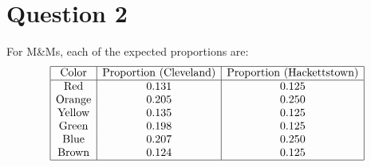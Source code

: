 \documentclass{article}
\begin{document}
\section*{Question 2}

\noindent For M\&Ms, each of the expected proportions are:
\[
\begin{array}{|c|c|c|}
\hline
\text{Color} & \text{Proportion (Cleveland)} & \text{Proportion (Hackettstown)}  \\
\hline
\text{Red} & 0.131 & 0.125  \\
\text{Orange} & 0.205 & 0.250  \\
\text{Yellow} & 0.135 & 0.125  \\
\text{Green} & 0.198 & 0.125  \\
\text{Blue} & 0.207 & 0.250  \\
\text{Brown} & 0.124 & 0.125  \\
\hline
\end{array}
\]
\end{document}
